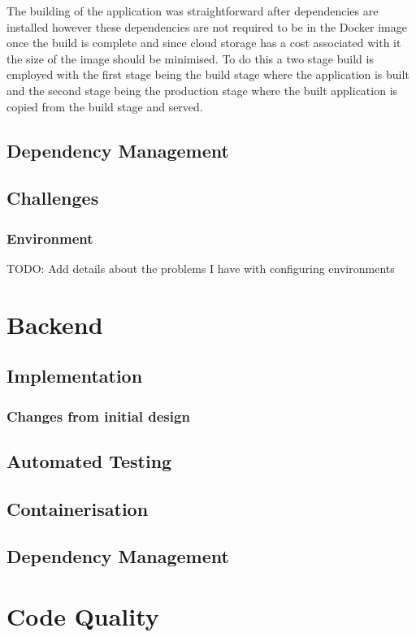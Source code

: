 The building of the application was straightforward after dependencies are installed however these dependencies are not required to be in the Docker image once the build is complete and since cloud storage has a cost associated with it the size of the image should be minimised. To do this a two stage build is employed with the first stage being the build stage where the application is built and the second stage being the production stage where the built application is copied from the build stage and served.

\subsection{Dependency Management}

\subsection{Challenges}
\subsubsection{Environment}
TODO: Add details about the problems I have with configuring environments

\section{Backend}
\subsection{Implementation}
\subsubsection{Changes from initial design}
\subsection{Automated Testing}
\subsection{Containerisation}
\subsection{Dependency Management}

\section{Code Quality} \label{sec:code-quality}
